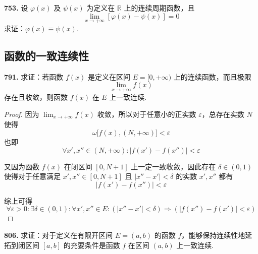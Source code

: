 \textbf{753.} 设 $\varphi(x)$ 及 $\psi(x)$ 为定义在 $\mathbb{R}$ 上的连续周期函数，且
\[\lim_{x \rightarrow +\infty} [\varphi(x) - \psi(x)] = 0\]
求证：$\varphi(x) \equiv \psi(x)$.

\subsection{函数的一致连续性}

\textbf{791.} 求证：若函数 $f(x)$ 是定义在区间 $E = [0, +\infty)$ 上的连续函数，而且极限
\[\lim_{x \rightarrow +\infty} f(x)\]
存在且收敛，则函数 $f(x)$ 在 $E$ 上一致连续.

\begin{proof}
    因为 $\displaystyle \lim_{x \rightarrow +\infty} f(x)$ 收敛，所以对于任意小的正实数 $\varepsilon$，总存在实数 $N$ 使得
    \[\omega\bigl[f(x), (N, +\infty)\bigr] < \varepsilon\]
    也即
    \[\forall x',x'' \in (N, +\infty): \lvert f(x') - f(x'')\rvert < \varepsilon\]

    又因为函数 $f(x)$ 在闭区间 $[0,N+1]$ 上一定一致收敛，因此存在 $\delta \in (0,1)$ 使得对于任意满足 $x',x'' \in [0, N+1]$ 且 $\lvert x'' - x'\rvert < \delta$ 的实数 $x',x''$ 都有
    \[\lvert f(x') - f(x'')\rvert < \varepsilon\]

    综上可得
    \[\forall \varepsilon > 0: \exists \delta \in (0,1): \forall x',x'' \in E: (\lvert x'' - x'\rvert < \delta) \Rightarrow (\lvert f(x'') - f(x')\rvert < \varepsilon)\]
\end{proof}

\textbf{806.} 求证：对于定义在有限开区间 $E = (a,b)$ 的函数 $f$，能够保持连续性地延拓到闭区间 $[a,b]$ 的充要条件是函数 $f$ 在区间 $(a,b)$ 上一致连续.


